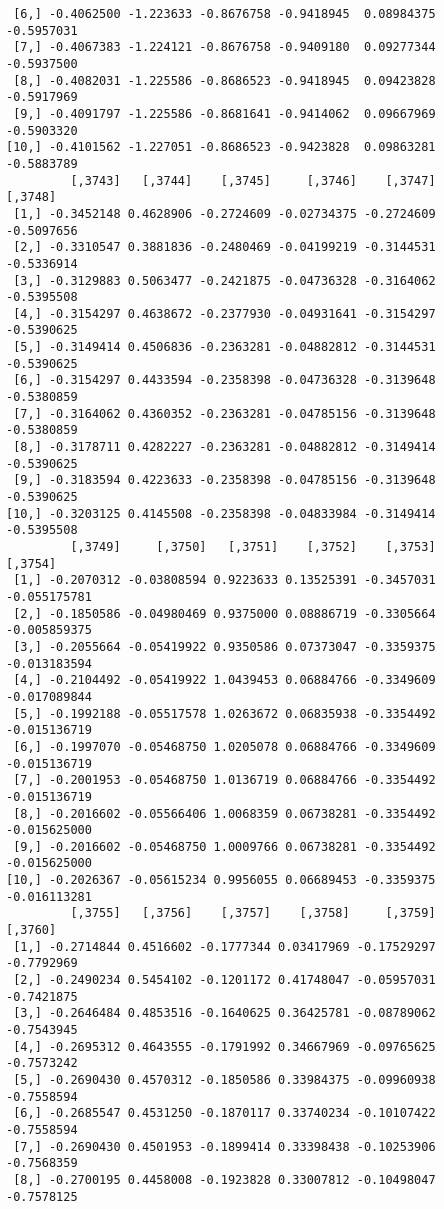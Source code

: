 \documentclass[
  letterpaper,
  DIV=11,
  numbers=noendperiod]{scrreprt}
\begin{document}
\begin{verbatim}
 [6,] -0.4062500 -1.223633 -0.8676758 -0.9418945  0.08984375 -0.5957031
 [7,] -0.4067383 -1.224121 -0.8676758 -0.9409180  0.09277344 -0.5937500
 [8,] -0.4082031 -1.225586 -0.8686523 -0.9418945  0.09423828 -0.5917969
 [9,] -0.4091797 -1.225586 -0.8681641 -0.9414062  0.09667969 -0.5903320
[10,] -0.4101562 -1.227051 -0.8686523 -0.9423828  0.09863281 -0.5883789
         [,3743]   [,3744]    [,3745]     [,3746]    [,3747]    [,3748]
 [1,] -0.3452148 0.4628906 -0.2724609 -0.02734375 -0.2724609 -0.5097656
 [2,] -0.3310547 0.3881836 -0.2480469 -0.04199219 -0.3144531 -0.5336914
 [3,] -0.3129883 0.5063477 -0.2421875 -0.04736328 -0.3164062 -0.5395508
 [4,] -0.3154297 0.4638672 -0.2377930 -0.04931641 -0.3154297 -0.5390625
 [5,] -0.3149414 0.4506836 -0.2363281 -0.04882812 -0.3144531 -0.5390625
 [6,] -0.3154297 0.4433594 -0.2358398 -0.04736328 -0.3139648 -0.5380859
 [7,] -0.3164062 0.4360352 -0.2363281 -0.04785156 -0.3139648 -0.5380859
 [8,] -0.3178711 0.4282227 -0.2363281 -0.04882812 -0.3149414 -0.5390625
 [9,] -0.3183594 0.4223633 -0.2358398 -0.04785156 -0.3139648 -0.5390625
[10,] -0.3203125 0.4145508 -0.2358398 -0.04833984 -0.3149414 -0.5395508
         [,3749]     [,3750]   [,3751]    [,3752]    [,3753]      [,3754]
 [1,] -0.2070312 -0.03808594 0.9223633 0.13525391 -0.3457031 -0.055175781
 [2,] -0.1850586 -0.04980469 0.9375000 0.08886719 -0.3305664 -0.005859375
 [3,] -0.2055664 -0.05419922 0.9350586 0.07373047 -0.3359375 -0.013183594
 [4,] -0.2104492 -0.05419922 1.0439453 0.06884766 -0.3349609 -0.017089844
 [5,] -0.1992188 -0.05517578 1.0263672 0.06835938 -0.3354492 -0.015136719
 [6,] -0.1997070 -0.05468750 1.0205078 0.06884766 -0.3349609 -0.015136719
 [7,] -0.2001953 -0.05468750 1.0136719 0.06884766 -0.3354492 -0.015136719
 [8,] -0.2016602 -0.05566406 1.0068359 0.06738281 -0.3354492 -0.015625000
 [9,] -0.2016602 -0.05468750 1.0009766 0.06738281 -0.3354492 -0.015625000
[10,] -0.2026367 -0.05615234 0.9956055 0.06689453 -0.3359375 -0.016113281
         [,3755]   [,3756]    [,3757]    [,3758]     [,3759]    [,3760]
 [1,] -0.2714844 0.4516602 -0.1777344 0.03417969 -0.17529297 -0.7792969
 [2,] -0.2490234 0.5454102 -0.1201172 0.41748047 -0.05957031 -0.7421875
 [3,] -0.2646484 0.4853516 -0.1640625 0.36425781 -0.08789062 -0.7543945
 [4,] -0.2695312 0.4643555 -0.1791992 0.34667969 -0.09765625 -0.7573242
 [5,] -0.2690430 0.4570312 -0.1850586 0.33984375 -0.09960938 -0.7558594
 [6,] -0.2685547 0.4531250 -0.1870117 0.33740234 -0.10107422 -0.7558594
 [7,] -0.2690430 0.4501953 -0.1899414 0.33398438 -0.10253906 -0.7568359
 [8,] -0.2700195 0.4458008 -0.1923828 0.33007812 -0.10498047 -0.7578125

\end{verbatim}
\end{document}
